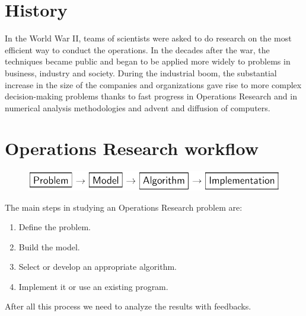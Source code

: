 \documentclass[12pt, a4paper]{report}
\newtheorem[style=M,bodystyle=\normalfont]{proposition}{Proposition}
\newtheorem[style=M,bodystyle=\normalfont]{theorem}{Theorem}
\newtheorem[style=M,bodystyle=\normalfont]{corollary}{Corollary}
\newtheorem[style=M,bodystyle=\normalfont]{lemma}{Lemma}
\newtheorem[style=M,bodystyle=\normalfont]{definition}{Definition}
\begin{document}
    \section{History}
    In the World War II, teams of scientists were asked to do research on the most efficient way to conduct the operations.
    In the decades after the war, the techniques became public and began to be applied more widely to problems in business, industry and society.
    During the industrial boom, the substantial increase in the size of the companies and organizations gave rise to more complex decision-making problems thanks to
    fast progress in Operations Research and in numerical analysis methodologies and advent and diffusion of computers. 

    \section{Operations Research workflow}
    \begin{figure}[H]
        \centering
        \includegraphics[width=1\linewidth]{images/study.png}
    \end{figure}
    The main steps in studying an Operations Research problem are: 
    \begin{enumerate}
        \item Define the problem.
        \item Build the model.
        \item Select or develop an appropriate algorithm. 
        \item Implement it or use an existing program. 
    \end{enumerate}
    After all this process we need to analyze the results with feedbacks. 
\end{document}
